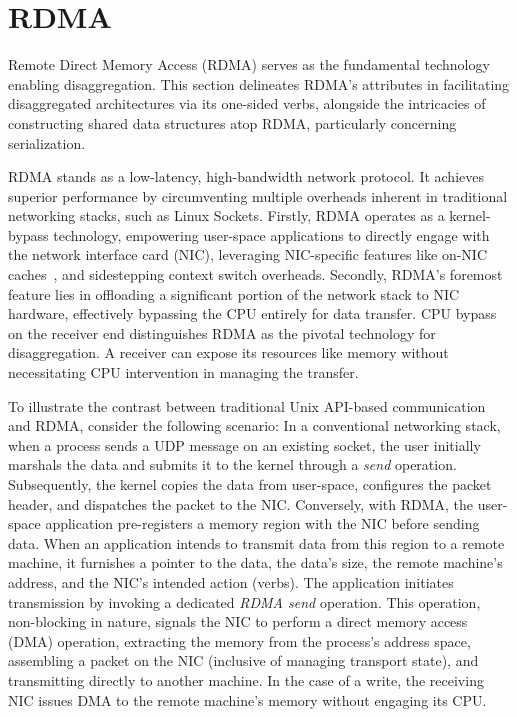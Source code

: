 \documentclass[12pt]{ucsddissertation}
\begin{document}
\section{RDMA}
\label{sec:rdma}

Remote Direct Memory Access (RDMA) serves as the fundamental technology enabling disaggregation.
This section delineates RDMA's attributes in facilitating disaggregated architectures via its
one-sided verbs, alongside the intricacies of constructing shared data structures atop RDMA,
particularly concerning serialization.

RDMA stands as a low-latency, high-bandwidth network protocol. It achieves superior performance by
circumventing multiple overheads inherent in traditional networking stacks, such as Linux Sockets.
Firstly, RDMA operates as a kernel-bypass technology, empowering user-space applications to directly
engage with the network interface card (NIC), leveraging NIC-specific features like on-NIC
caches~\cite{sherman}, and sidestepping context switch overheads. Secondly, RDMA's foremost feature
lies in offloading a significant portion of the network stack to NIC hardware, effectively bypassing
the CPU entirely for data transfer. CPU bypass on the receiver end distinguishes RDMA as the pivotal
technology for disaggregation. A receiver can expose its resources like memory without necessitating
CPU intervention in managing the transfer.

To illustrate the contrast between traditional Unix API-based communication and RDMA, consider the
following scenario: In a conventional networking stack, when a process sends a UDP message on an
existing socket, the user initially marshals the data and submits it to the kernel through a
\textit{send} operation. Subsequently, the kernel copies the data from user-space, configures the
packet header, and dispatches the packet to the NIC. Conversely, with RDMA, the user-space
application pre-registers a memory region with the NIC before sending data. When an application
intends to transmit data from this region to a remote machine, it furnishes a pointer to the data,
the data's size, the remote machine's address, and the NIC's intended action (verbs). The
application initiates transmission by invoking a dedicated \textit{RDMA send} operation. This
operation, non-blocking in nature, signals the NIC to perform a direct memory access (DMA)
operation, extracting the memory from the process's address space, assembling a packet on the NIC
(inclusive of managing transport state), and transmitting directly to another machine. In the case
of a write, the receiving NIC issues DMA to the remote machine's memory without engaging its CPU.
\end{document}
